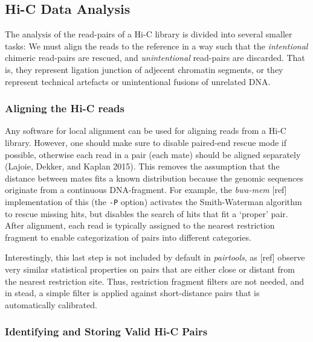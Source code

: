 \documentclass[
  11pt,
  a4paper,
]{scrbook}
\let\oldemph\emph
\renewcommand\emph[1]{\oldemph{\color{gray}#1}}
\begin{document}
\subsection{Hi-C Data Analysis}\label{hi-c-data-analysis}

The analysis of the read-pairs of a Hi-C library is divided into several
smaller tasks: We must align the reads to the reference in a way such
that the \emph{intentional} chimeric read-pairs are rescued, and
\emph{unintentional} read-pairs are discarded. That is, they represent
ligation junction of adjecent chromatin segments, or they represent
technical artefacts or unintentional fusions of unrelated DNA.

\subsubsection{Aligning the Hi-C reads}\label{aligning-the-hi-c-reads}

Any software for local alignment can be used for aligning reads from a
Hi-C library. However, one should make sure to disable paired-end rescue
mode if possible, otherwise each read in a pair (each mate) should be
aligned separately (Lajoie, Dekker, and Kaplan 2015). This removes the
assumption that the distance between mates fits a known distribution
because the genomic sequences originate from a continuous DNA-fragment.
For example, the \emph{bwa-mem} {[}ref{]} implementation of this (the
\texttt{-P} option) activates the Smith-Waterman algorithm to rescue
missing hits, but disables the search of hits that fit a `proper' pair.
After alignment, each read is typically assigned to the nearest
restriction fragment to enable categorization of pairs into different
categories.

Interestingly, this last step is not included by default in
\emph{pairtools}, as {[}ref{]} observe very similar statistical
properties on pairs that are either close or distant from the nearest
restriction site. Thus, restriction fragment filters are not needed, and
in stead, a simple filter is applied against short-distance pairs that
is automatically calibrated.

\subsubsection{Identifying and Storing Valid Hi-C
Pairs}\label{identifying-and-storing-valid-hi-c-pairs}
\end{document}
